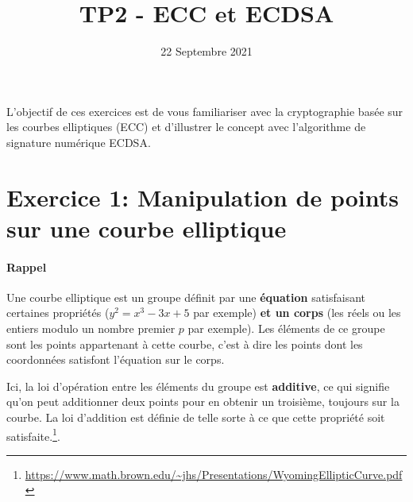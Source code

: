 \documentclass[french,a4paper,11pt]{exam}
\title{\textbf{TP2 - ECC et ECDSA}}
\date{22 Septembre 2021}
\begin{document}
\maketitle

L'objectif de ces exercices est de vous familiariser avec la cryptographie basée sur
les courbes elliptiques (ECC) et d'illustrer le concept avec l'algorithme de signature
numérique ECDSA. 



\begin{center}
\end{center}


\section*{Exercice 1: Manipulation de points sur une courbe elliptique}

\paragraph{Rappel} Une courbe elliptique est un groupe définit par une \textbf{équation} satisfaisant certaines propriétés ($y^2 = x^3 - 3x + 5$ par exemple) \textbf{et un corps} (les réels ou les entiers modulo un nombre premier $p$ par exemple). Les éléments de ce groupe sont les points appartenant à cette courbe, c'est à dire les points dont les coordonnées satisfont l'équation sur le corps.

Ici, la loi d'opération entre les éléments du groupe est \textbf{additive}, ce qui signifie qu'on peut additionner deux points pour en obtenir un troisième, toujours sur la courbe. La loi d'addition est définie de telle sorte à ce que cette propriété soit satisfaite.\footnote{\url{https://www.math.brown.edu/~jhs/Presentations/WyomingEllipticCurve.pdf}}. 
\end{document}
